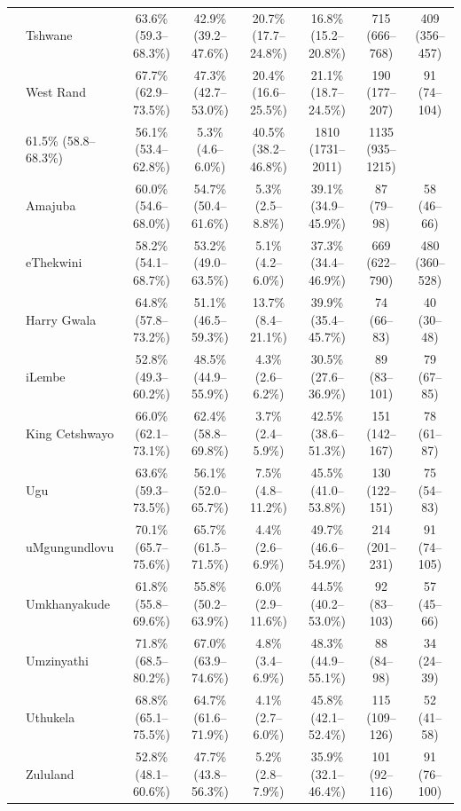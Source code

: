 \documentclass{article}
\begin{document}
\begin{landscape}
{\begin{longtable}[c]{llc cc ccc}
      & Tshwane & 63.6\% (59.3--68.3\%) & 42.9\% (39.2--47.6\%) & 20.7\% (17.7--24.8\%) & 16.8\% (15.2--20.8\%) & 715 (666--768) & 409 (356--457) \\
      & West Rand & 67.7\% (62.9--73.5\%) & 47.3\% (42.7--53.0\%) & 20.4\% (16.6--25.5\%) & 21.1\% (18.7--24.5\%) & 190 (177--207) & 91 (74--104) \\
      \pagebreak
      \multicolumn{2}{l}{KwaZulu-Natal} & 61.5\% (58.8--68.3\%) & 56.1\% (53.4--62.8\%) & 5.3\% (4.6--6.0\%) & 40.5\% (38.2--46.8\%) & 1810 (1731--2011) & 1135 (935--1215) \\
      & Amajuba & 60.0\% (54.6--68.0\%) & 54.7\% (50.4--61.6\%) & 5.3\% (2.5--8.8\%) & 39.1\% (34.9--45.9\%) & 87 (79--98) & 58 (46--66) \\
      & eThekwini & 58.2\% (54.1--68.7\%) & 53.2\% (49.0--63.5\%) & 5.1\% (4.2--6.0\%) & 37.3\% (34.4--46.9\%) & 669 (622--790) & 480 (360--528) \\
      & Harry Gwala & 64.8\% (57.8--73.2\%) & 51.1\% (46.5--59.3\%) & 13.7\% (8.4--21.1\%) & 39.9\% (35.4--45.7\%) & 74 (66--83) & 40 (30--48) \\
      & iLembe & 52.8\% (49.3--60.2\%) & 48.5\% (44.9--55.9\%) & 4.3\% (2.6--6.2\%) & 30.5\% (27.6--36.9\%) & 89 (83--101) & 79 (67--85) \\
      & King Cetshwayo & 66.0\% (62.1--73.1\%) & 62.4\% (58.8--69.8\%) & 3.7\% (2.4--5.9\%) & 42.5\% (38.6--51.3\%) & 151 (142--167) & 78 (61--87) \\
      & Ugu & 63.6\% (59.3--73.5\%) & 56.1\% (52.0--65.7\%) & 7.5\% (4.8--11.2\%) & 45.5\% (41.0--53.8\%) & 130 (122--151) & 75 (54--83) \\
      & uMgungundlovu & 70.1\% (65.7--75.6\%) & 65.7\% (61.5--71.5\%) & 4.4\% (2.6--6.9\%) & 49.7\% (46.6--54.9\%) & 214 (201--231) & 91 (74--105) \\
      & Umkhanyakude & 61.8\% (55.8--69.6\%) & 55.8\% (50.2--63.9\%) & 6.0\% (2.9--11.6\%) & 44.5\% (40.2--53.0\%) & 92 (83--103) & 57 (45--66) \\
      & Umzinyathi & 71.8\% (68.5--80.2\%) & 67.0\% (63.9--74.6\%) & 4.8\% (3.4--6.9\%) & 48.3\% (44.9--55.1\%) & 88 (84--98) & 34 (24--39) \\
      & Uthukela & 68.8\% (65.1--75.5\%) & 64.7\% (61.6--71.9\%) & 4.1\% (2.7--6.0\%) & 45.8\% (42.1--52.4\%) & 115 (109--126) & 52 (41--58) \\
      & Zululand & 52.8\% (48.1--60.6\%) & 47.7\% (43.8--56.3\%) & 5.2\% (2.8--7.9\%) & 35.9\% (32.1--46.4\%) & 101 (92--116) & 91 (76--100) \\[5pt]

\end{longtable}}
\end{landscape}
\end{document}
